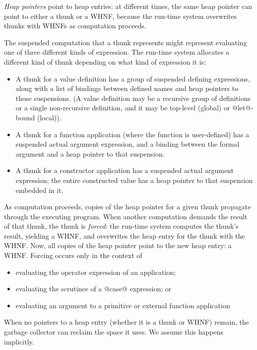 \documentclass[10pt]{article}
\begin{document}
{\it Heap pointers} point to heap entries: at different times, the same heap pointer can point to either a thunk or a WHNF, because the run-time system overwrites thunks with WHNFs as computation proceeds.

The suspended computation that a thunk represents might represent evaluating one of three different kinds of expression. The run-time system allocates a different kind of thunk depending on what kind of expression it is:
\begin{itemize}
\item A thunk for a value definition has a group of suspended defining expressions, along with a list of bindings between defined names and heap pointers to those suspensions. (A value definition may be a recursive group of definitions or a single non-recursive definition, and it may be top-level (global) or @let@-bound (local)).

\item A thunk for a function application (where the function is user-defined) has a suspended actual argument expression, and a binding between the formal argument and a heap pointer to that suspension.

\item A thunk for a constructor application has a suspended actual argument expression; the entire constructed value has a heap pointer to that suspension embedded in it.
\end{itemize}

As computation proceeds, copies of the heap pointer for a given thunk propagate through the executing program. 
When another computation demands the result of that thunk, the thunk is {\it forced}: the run-time system computes the thunk's result, yielding a WHNF, and overwrites the heap entry for the thunk with the WHNF. Now, all copies of the heap pointer point to the new heap entry: a WHNF. Forcing occurs
only in the context of
\begin{itemize}
\item evaluating the operator expression of an application; 

\item evaluating the scrutinee of a @case@ expression; or 

\item evaluating an argument to a primitive or external function application
\end{itemize}

When no pointers to a heap entry (whether it is a thunk or WHNF) remain, the garbage collector can reclaim the space it uses. We assume this happens implicitly.
\end{document}
